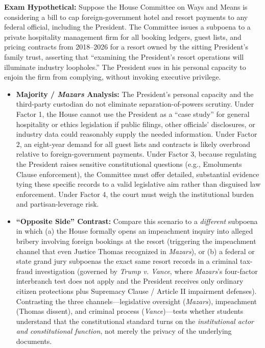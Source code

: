 \documentclass[12pt]{article}
\begin{document}
\textbf{Exam Hypothetical:}
Suppose the House Committee on Ways and Means is considering a bill to cap foreign-government hotel and resort payments to any federal official, including the President. The Committee issues a subpoena to a private hospitality management firm for all booking ledgers, guest lists, and pricing contracts from 2018--2026 for a resort owned by the sitting President's family trust, asserting that ``examining the President's resort operations will illuminate industry loopholes.'' The President sues in his personal capacity to enjoin the firm from complying, without invoking executive privilege.
\begin{itemize}
  \item \textbf{Majority / \textit{Mazars} Analysis:} The President's personal capacity and the third-party custodian do not eliminate separation-of-powers scrutiny. Under Factor 1, the House cannot use the President as a ``case study'' for general hospitality or ethics legislation if public filings, other officials' disclosures, or industry data could reasonably supply the needed information. Under Factor 2, an eight-year demand for all guest lists and contracts is likely overbroad relative to foreign-government payments. Under Factor 3, because regulating the President raises sensitive constitutional questions (e.g., Emoluments Clause enforcement), the Committee must offer detailed, substantial evidence tying these specific records to a valid legislative aim rather than disguised law enforcement. Under Factor 4, the court must weigh the institutional burden and partisan-leverage risk.
  \item \textbf{``Opposite Side'' Contrast:} Compare this scenario to a \textit{different} subpoena in which (a) the House formally opens an impeachment inquiry into alleged bribery involving foreign bookings at the resort (triggering the impeachment channel that even Justice Thomas recognized in \textit{Mazars}), or (b) a federal or state grand jury subpoenas the exact same resort records in a criminal tax-fraud investigation (governed by \textit{Trump v. Vance}, where \textit{Mazars}'s four-factor interbranch test does not apply and the President receives only ordinary citizen protections plus Supremacy Clause / Article II impairment defenses). Contrasting the three channels---legislative oversight (\textit{Mazars}), impeachment (Thomas dissent), and criminal process (\textit{Vance})---tests whether students understand that the constitutional standard turns on the \textit{institutional actor and constitutional function}, not merely the privacy of the underlying documents.
\end{itemize}
\end{document}
